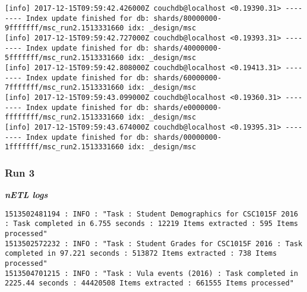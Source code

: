 \begin{verbatim}
[info] 2017-12-15T09:59:42.426000Z couchdb@localhost <0.19390.31> -------- Index update finished for db: shards/80000000-9fffffff/msc_run2.1513331660 idx: _design/msc
[info] 2017-12-15T09:59:42.727000Z couchdb@localhost <0.19393.31> -------- Index update finished for db: shards/40000000-5fffffff/msc_run2.1513331660 idx: _design/msc
[info] 2017-12-15T09:59:42.808000Z couchdb@localhost <0.19413.31> -------- Index update finished for db: shards/60000000-7fffffff/msc_run2.1513331660 idx: _design/msc
[info] 2017-12-15T09:59:43.099000Z couchdb@localhost <0.19360.31> -------- Index update finished for db: shards/e0000000-ffffffff/msc_run2.1513331660 idx: _design/msc
[info] 2017-12-15T09:59:43.674000Z couchdb@localhost <0.19395.31> -------- Index update finished for db: shards/00000000-1fffffff/msc_run2.1513331660 idx: _design/msc
\end{verbatim}


\subsubsection{Run 3}
\textit{\textbf{nETL logs}}
\begin{verbatim}
1513502481194 : INFO : "Task : Student Demographics for CSC1015F 2016 : Task completed in 6.755 seconds : 12219 Items extracted : 595 Items processed"
1513502572232 : INFO : "Task : Student Grades for CSC1015F 2016 : Task completed in 97.221 seconds : 513872 Items extracted : 738 Items processed"
1513504701215 : INFO : "Task : Vula events (2016) : Task completed in 2225.44 seconds : 44420508 Items extracted : 661555 Items processed"
\end{verbatim}

